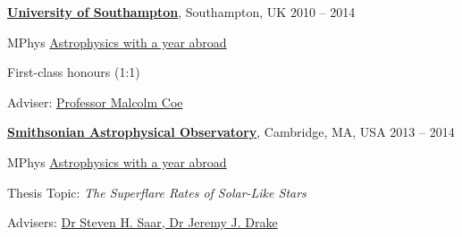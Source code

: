 \documentclass[11pt]{article}
\newcommand{\halfblankline}{\quad\vspace{-0.5\baselineskip}\pagebreak[3]}
\begin{document}
\halfblankline

\href{http://www.soton.ac.uk/}{\textbf{University of Southampton}},
Southampton, UK \hfill {2010 -- 2014}
\begin{innerlist}

\item[] MPhys
        \href{http://www.phys.soton.ac.uk/programmes/f3fm-mphys-astronomy-year-abroad-4-yrs/}
             {Astrophysics with a year abroad}
        \begin{innerlist}
        \item[] First-class honours (1:1)
         \item[] Adviser:
              \href{}
                   {Professor Malcolm Coe}
        \end{innerlist}

\end{innerlist}


\href{https://www.cfa.harvard.edu/}{\textbf{Smithsonian Astrophysical Observatory}}, %
Cambridge, MA, USA \hfill {2013 -- 2014}
\begin{innerlist}

\item[] MPhys
        \href{http://www.phys.soton.ac.uk/programmes/f3fm-mphys-astronomy-year-abroad-4-yrs/}
             {Astrophysics with a year abroad}
        \begin{innerlist}
        \item[] Thesis Topic: \emph{The Superflare Rates of Solar-Like Stars}
        \item[] Advisers:
              \href{}
                   {Dr Steven H. Saar, Dr Jeremy J. Drake}
        \end{innerlist}

\end{innerlist}
\end{document}

